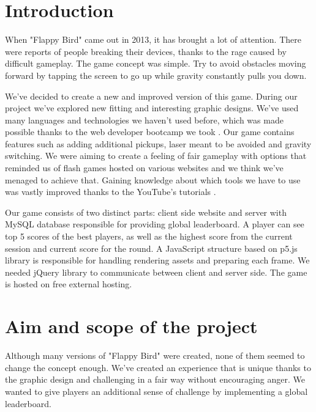 \documentclass[oneside,a4paper,11pt]{report}
\begin{document}







\chapter{Introduction}
When "Flappy Bird" came out in 2013, it has brought a lot of attention. There were reports of people breaking their devices, thanks to the rage caused by difficult gameplay. The game concept was simple. Try to avoid obstacles moving forward by tapping the screen to go up while gravity constantly pulls you down.

\par
We've decided to create a new and improved version of this game. During our project we've explored new fitting and interesting graphic designs. We've used many languages and technologies we haven't used before, which was made possible thanks to the web developer bootcamp we took \cite{Bootcamp}. Our game contains features such as adding additional pickups, laser meant to be avoided and gravity switching. We were aiming to create a feeling of fair gameplay with options that reminded us of flash games hosted on various websites and we think we've menaged to achieve that. Gaining knowledge about which tools we have to use was vastly improved thanks to the
YouTube's tutorials \cite{CodingTrain} \cite{Phpcourse} \cite{ProgrammingwithMosh}.

\par
Our game consists of two distinct parts: client side website and server with MySQL database responsible for providing global leaderboard. A player can see top 5 scores of the best players, as well as the highest score from the current session and current score for the round. A JavaScript structure based on p5.js library is responsible for handling rendering assets and preparing each frame. We needed jQuery library to communicate between client and server side. The game is hosted on free external hosting.


\chapter{Aim and scope of the project}

Although many versions of "Flappy Bird" were created, none of them seemed to change the concept enough. We've created an experience that is unique thanks to the graphic design and challenging in a fair way without encouraging anger. We wanted to give players an additional sense of challenge by implementing a global leaderboard.
\end{document}
